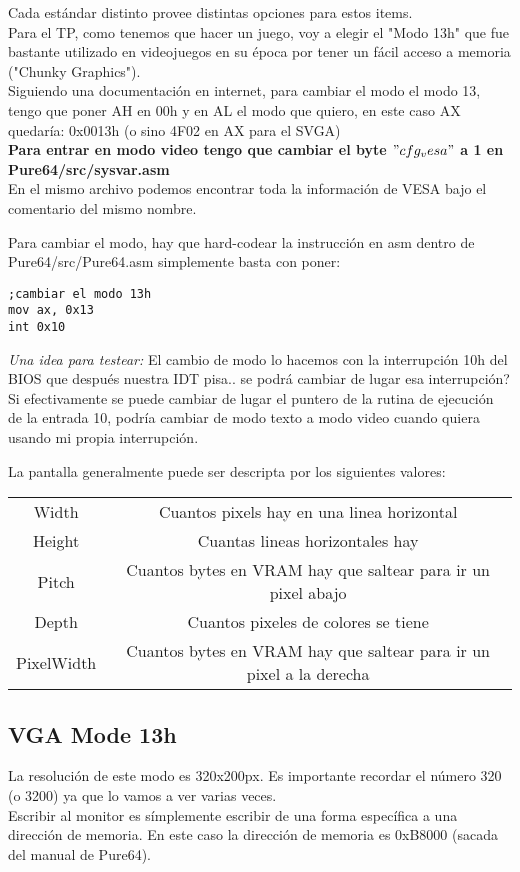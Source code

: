 \documentclass[]{article}
\begin{document}
Cada est\'andar distinto provee distintas opciones para estos items.\\

Para el TP, como tenemos que hacer un juego, voy a elegir el "Modo 13h" que fue bastante utilizado en videojuegos en su \'epoca por tener un f\'acil acceso a memoria ("Chunky Graphics").\\

Siguiendo una documentaci\'on en internet, para cambiar el modo el modo 13, tengo que poner AH en 00h y en AL el modo que quiero, en este caso AX quedar\'ia: 0x0013h (o sino 4F02 en AX para el SVGA) \\

\textbf{Para entrar en modo video tengo que cambiar el byte $"cfg_vesa"$ a 1 en Pure64/src/sysvar.asm}\\

En el mismo archivo podemos encontrar toda la informaci\'on de VESA bajo el comentario del mismo nombre.

Para cambiar el modo, hay que hard-codear la instrucci\'on en asm dentro de Pure64/src/Pure64.asm simplemente basta con poner:

\begin{verbatim}
;cambiar el modo 13h
mov ax, 0x13
int 0x10

\end{verbatim}

\textit{Una idea para testear:} El cambio de modo lo hacemos con la interrupci\'on 10h del BIOS que despu\'es nuestra IDT pisa.. se podr\'a cambiar de lugar esa interrupci\'on? Si efectivamente se puede cambiar de lugar el puntero de la rutina de ejecuci\'on de la entrada 10, podr\'ia cambiar de modo texto a modo video cuando quiera usando mi propia interrupci\'on.

La pantalla generalmente puede ser descripta por los siguientes valores:\\

\begin{tabular}{ |c|c|}
	\hline
	Width & Cuantos pixels hay en una linea horizontal\\
	Height & Cuantas lineas horizontales hay\\
	Pitch & Cuantos bytes en VRAM hay que saltear para ir un pixel abajo\\
	Depth & Cuantos pixeles de colores se tiene\\
	PixelWidth &  Cuantos bytes en VRAM hay que saltear para ir un pixel a la derecha\\
	\hline
\end{tabular}

\subsection*{VGA Mode 13h}

La resoluci\'on de este modo es 320x200px. Es importante recordar el n\'umero 320 (o 3200) ya que lo vamos a ver varias veces.\\

Escribir al monitor es s\'implemente escribir de una forma espec\'ifica a una direcci\'on de memoria. En este caso la direcci\'on de memoria es 0xB8000 (sacada del manual de Pure64).
\end{document}
